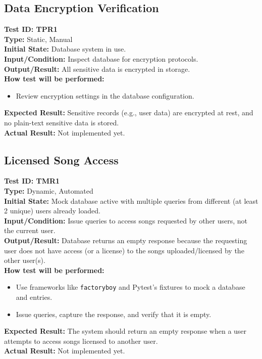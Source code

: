 \documentclass[12pt, titlepage]{article}
\begin{document}
\subsection{Data Encryption Verification}

\textbf{Test ID: TPR1}\\
\textbf{Type:} Static, Manual\\
\textbf{Initial State:} Database system in use.\\
\textbf{Input/Condition:} Inspect database for encryption protocols.\\
\textbf{Output/Result:} All sensitive data is encrypted in storage.\\
\textbf{How test will be performed:}
\begin{itemize}
  \item Review encryption settings in the database configuration.
\end{itemize}
\textbf{Expected Result:} Sensitive records (e.g., user data) are encrypted at rest, and no plain-text sensitive data is stored.\\
\textbf{Actual Result:} Not implemented yet.

\subsection{Licensed Song Access}

\textbf{Test ID: TMR1}\\
\textbf{Type:} Dynamic, Automated\\
\textbf{Initial State:} Mock database active with multiple queries from different (at least 2 unique) users already loaded.\\
\textbf{Input/Condition:} Issue queries to access songs requested by other users, not the current user.\\
\textbf{Output/Result:} Database returns an empty response because the requesting user does not have access (or a license) to the songs uploaded/licensed by the other user(s).\\
\textbf{How test will be performed:}
\begin{itemize}
    \item Use frameworks like \texttt{factoryboy} and Pytest's fixtures to mock a database and entries.
    \item Issue queries, capture the response, and verify that it is empty.
\end{itemize}
\textbf{Expected Result:} The system should return an empty response when a user attempts to access songs licensed to another user.\\
\textbf{Actual Result:} Not implemented yet.
\end{document}
